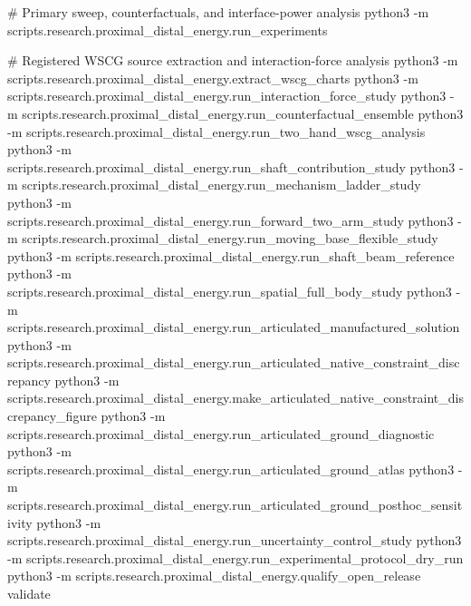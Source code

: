 \documentclass[
  letterpaper,
]{report}
\newenvironment{Shaded}{\begin{snugshade}}{\end{snugshade}}
\newcommand{\AttributeTok}[1]{\textcolor[rgb]{0.40,0.45,0.13}{#1}}
\newcommand{\CommentTok}[1]{\textcolor[rgb]{0.37,0.37,0.37}{#1}}
\newcommand{\ExtensionTok}[1]{\textcolor[rgb]{0.00,0.23,0.31}{#1}}
\newcommand{\NormalTok}[1]{\textcolor[rgb]{0.00,0.23,0.31}{#1}}
\begin{document}
\begin{Shaded}
\begin{Highlighting}[]
\CommentTok{\# Primary sweep, counterfactuals, and interface{-}power analysis}
\ExtensionTok{python3} \AttributeTok{{-}m}\NormalTok{ scripts.research.proximal\_distal\_energy.run\_experiments}

\CommentTok{\# Registered WSCG source extraction and interaction{-}force analysis}
\ExtensionTok{python3} \AttributeTok{{-}m}\NormalTok{ scripts.research.proximal\_distal\_energy.extract\_wscg\_charts}
\ExtensionTok{python3} \AttributeTok{{-}m}\NormalTok{ scripts.research.proximal\_distal\_energy.run\_interaction\_force\_study}
\ExtensionTok{python3} \AttributeTok{{-}m}\NormalTok{ scripts.research.proximal\_distal\_energy.run\_counterfactual\_ensemble}
\ExtensionTok{python3} \AttributeTok{{-}m}\NormalTok{ scripts.research.proximal\_distal\_energy.run\_two\_hand\_wscg\_analysis}
\ExtensionTok{python3} \AttributeTok{{-}m}\NormalTok{ scripts.research.proximal\_distal\_energy.run\_shaft\_contribution\_study}
\ExtensionTok{python3} \AttributeTok{{-}m}\NormalTok{ scripts.research.proximal\_distal\_energy.run\_mechanism\_ladder\_study}
\ExtensionTok{python3} \AttributeTok{{-}m}\NormalTok{ scripts.research.proximal\_distal\_energy.run\_forward\_two\_arm\_study}
\ExtensionTok{python3} \AttributeTok{{-}m}\NormalTok{ scripts.research.proximal\_distal\_energy.run\_moving\_base\_flexible\_study}
\ExtensionTok{python3} \AttributeTok{{-}m}\NormalTok{ scripts.research.proximal\_distal\_energy.run\_shaft\_beam\_reference}
\ExtensionTok{python3} \AttributeTok{{-}m}\NormalTok{ scripts.research.proximal\_distal\_energy.run\_spatial\_full\_body\_study}
\ExtensionTok{python3} \AttributeTok{{-}m}\NormalTok{ scripts.research.proximal\_distal\_energy.run\_articulated\_manufactured\_solution}
\ExtensionTok{python3} \AttributeTok{{-}m}\NormalTok{ scripts.research.proximal\_distal\_energy.run\_articulated\_native\_constraint\_discrepancy}
\ExtensionTok{python3} \AttributeTok{{-}m}\NormalTok{ scripts.research.proximal\_distal\_energy.make\_articulated\_native\_constraint\_discrepancy\_figure}
\ExtensionTok{python3} \AttributeTok{{-}m}\NormalTok{ scripts.research.proximal\_distal\_energy.run\_articulated\_ground\_diagnostic}
\ExtensionTok{python3} \AttributeTok{{-}m}\NormalTok{ scripts.research.proximal\_distal\_energy.run\_articulated\_ground\_atlas}
\ExtensionTok{python3} \AttributeTok{{-}m}\NormalTok{ scripts.research.proximal\_distal\_energy.run\_articulated\_ground\_posthoc\_sensitivity}
\ExtensionTok{python3} \AttributeTok{{-}m}\NormalTok{ scripts.research.proximal\_distal\_energy.run\_uncertainty\_control\_study}
\ExtensionTok{python3} \AttributeTok{{-}m}\NormalTok{ scripts.research.proximal\_distal\_energy.run\_experimental\_protocol\_dry\_run}
\ExtensionTok{python3} \AttributeTok{{-}m}\NormalTok{ scripts.research.proximal\_distal\_energy.qualify\_open\_release validate}


\end{Highlighting}
\end{Shaded}
\end{document}
